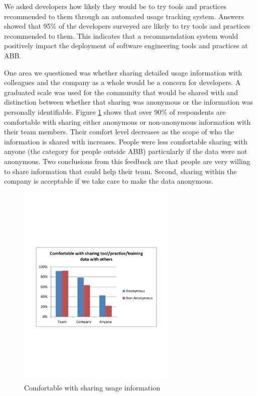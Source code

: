 \documentclass{sig-alternate}
\begin{document}
We asked developers how likely they would be to try tools and practices recommended to them through an automated usage tracking system.  Answers showed that 95\% of the developers surveyed are likely to try tools and practices recommended to them.  This indicates that a recommendation system would positively impact the deployment of software engineering tools and practices at ABB.

One area we questioned was whether sharing detailed usage information with colleagues and the company as a whole would be a concern for developers.  A graduated scale was used for the community that would be shared with and distinction between whether that sharing was anonymous or the information was personally identifiable. Figure \ref{fig:comfortwithsharing}  shows that over 90\% of respondents are comfortable with sharing either anonymous or non-anonymous information with their team members. 
Their comfort level decreases as the scope of who the information is shared with increases.  People were less comfortable sharing with anyone (the category for people outside ABB) particularly if the data were not anonymous.  
Two conclusions from this feedback are that people are very willing to share information that could help their team. Second, sharing within the company is acceptable if we take care to make the data anonymous.

\begin{figure}\begin{mdframed}[linecolor=white]
	\includegraphics[width=3in]{ComfortWithSharing.pdf}
	\caption{Comfortable with sharing usage information}
	\label{fig:comfortwithsharing}
\end{mdframed}\end{figure}
\end{document}
